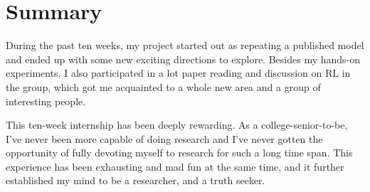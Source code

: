 \section{Summary}
\label{sec:summary}

During the past ten weeks, my project started out as repeating a published model and ended up with some new exciting directions to explore. Besides my hands-on experiments, I also participated in a lot paper reading and discussion on RL in the group, which got me acquainted to a whole new area and a group of interesting people.

This ten-week internship has been deeply rewarding. As a college-senior-to-be, I've never been more capable of doing research and I've never gotten the opportunity of fully devoting myself to research for such a long time span. This experience has been exhausting and mad fun at the same time, and it further established my mind to be a researcher, and a truth seeker.